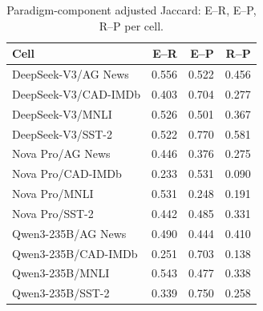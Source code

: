 \begin{table}[t]
\centering
\small
\caption{Paradigm-component adjusted Jaccard: E--R, E--P, R--P per cell.}
\label{tab:paradigms}
\begin{tabular}{lrrr}
\toprule
Cell & E--R & E--P & R--P \\
\midrule
DeepSeek-V3/AG News & 0.556 & 0.522 & 0.456 \\
DeepSeek-V3/CAD-IMDb & 0.403 & 0.704 & 0.277 \\
DeepSeek-V3/MNLI & 0.526 & 0.501 & 0.367 \\
DeepSeek-V3/SST-2 & 0.522 & 0.770 & 0.581 \\
Nova Pro/AG News & 0.446 & 0.376 & 0.275 \\
Nova Pro/CAD-IMDb & 0.233 & 0.531 & 0.090 \\
Nova Pro/MNLI & 0.531 & 0.248 & 0.191 \\
Nova Pro/SST-2 & 0.442 & 0.485 & 0.331 \\
Qwen3-235B/AG News & 0.490 & 0.444 & 0.410 \\
Qwen3-235B/CAD-IMDb & 0.251 & 0.703 & 0.138 \\
Qwen3-235B/MNLI & 0.543 & 0.477 & 0.338 \\
Qwen3-235B/SST-2 & 0.339 & 0.750 & 0.258 \\
\bottomrule
\end{tabular}
\end{table}
